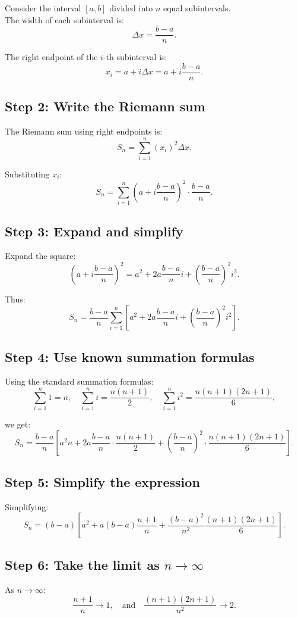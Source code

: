 \documentclass{article}
\begin{document}
Consider the interval $[a,b]$ divided into $n$ equal subintervals. \\ The width of each subinterval is:
\[
\Delta x = \frac{b - a}{n}.
\]

The right endpoint of the $i$-th subinterval is:
\[
x_i = a + i \Delta x=a + i\frac{b - a}{n}.
\]

\subsection*{Step 2: Write the Riemann sum}

The Riemann sum using right endpoints is:
\[
S_n = \sum_{i=1}^{n} (x_i)^2 \Delta x.
\]

Substituting $x_i$:
\[
S_n = \sum_{i=1}^{n} \left(a + i\frac{b-a}{n}\right)^2 \cdot \frac{b-a}{n}.
\]

\subsection*{Step 3: Expand and simplify}

Expand the square:
\[
\left(a + i\frac{b-a}{n}\right)^2 = a^2 + 2a\frac{b-a}{n}i + \left(\frac{b-a}{n}\right)^2 i^2.
\]

Thus:
\[
S_n = \frac{b-a}{n} \sum_{i=1}^{n} \left[ a^2 + 2a\frac{b-a}{n}i + \left(\frac{b-a}{n}\right)^2 i^2 \right].
\]

\subsection*{Step 4: Use known summation formulas}

Using the standard summation formulas:
\[
\sum_{i=1}^{n} 1 = n, \quad \sum_{i=1}^{n} i = \frac{n(n+1)}{2}, \quad \sum_{i=1}^{n} i^2 = \frac{n(n+1)(2n+1)}{6},
\]

we get:
\[
S_n = \frac{b-a}{n} \left[ a^2 n + 2a\frac{b-a}{n}\cdot \frac{n(n+1)}{2} + \left(\frac{b-a}{n}\right)^2 \cdot \frac{n(n+1)(2n+1)}{6} \right].
\]

\subsection*{Step 5: Simplify the expression}

Simplifying:
\[
S_n = (b-a)\left[ a^2 + a(b-a)\frac{n+1}{n} + \frac{(b-a)^2}{n^2}\frac{(n+1)(2n+1)}{6} \right].
\]

\subsection*{Step 6: Take the limit as $n \to \infty$}
As $n \to \infty$:
\[
\frac{n+1}{n} \to 1, \quad \text{and} \quad \frac{(n+1)(2n+1)}{n^2} \to 2.
\]
\end{document}
